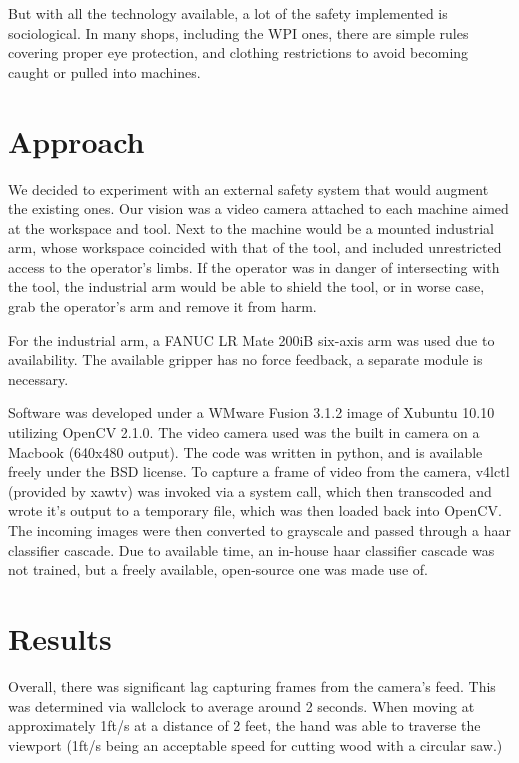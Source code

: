 \documentclass[12pt]{article}
\begin{document}
But with all the technology available, a lot of the safety implemented is sociological. In many shops, including the WPI ones, there are simple rules covering proper eye protection, and clothing restrictions to avoid becoming caught or pulled into machines\cite{WPI:safety}.

\section{Approach}
We decided to experiment with an external safety system that would augment the existing ones. Our vision was a video camera attached to each machine aimed at the workspace and tool. Next to the machine would be a mounted industrial arm, whose workspace coincided with that of the tool, and included unrestricted access to the operator's limbs. If the operator was in danger of intersecting with the tool, the industrial arm would be able to shield the tool, or in worse case, grab the operator's arm and remove it from harm.


For the industrial arm, a FANUC LR Mate 200iB six-axis arm was used due to availability\cite{fanuc}. The available gripper has no force feedback, a separate module is necessary. 

Software was developed under a WMware Fusion 3.1.2 image of Xubuntu 10.10 utilizing OpenCV 2.1.0. The video camera used was the built in camera on a Macbook (640x480 output). The code was written in python, and is available freely under the BSD license\cite{google-code}. To capture a frame of video from the camera, v4lctl (provided by xawtv) was invoked via a system call, which then transcoded and wrote it's output to a temporary file, which was then loaded back into OpenCV. The incoming images were then converted to grayscale and passed through a haar classifier cascade. Due to available time, an in-house haar classifier cascade was not trained, but a freely available, open-source one was made use of\cite{haar-hands}.

\section{Results}
Overall, there was significant lag capturing frames from the camera's feed. This was determined via wallclock to average around 2 seconds. When moving at approximately 1ft/s at a distance of 2 feet, the hand was able to traverse the viewport (1ft/s being an acceptable speed for cutting wood with a circular saw\cite{sawstop}.)
\end{document}
